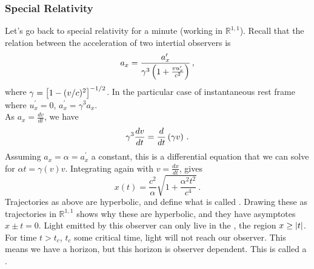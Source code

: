 \documentclass{article}
\begin{document}
\subsubsection{Special Relativity}
Let's go back to special relativity for a minute (working in $\mathbb{R}^{1,1}$). Recall that the relation between the acceleration of two intertial observers is 
\[
a_x = \frac{a_x^\prime}{\gamma^3 \left( 1 + \frac{v u_x^\prime}{c^2} \right)} \, , 
\]
where $\gamma = \left[ 1-(v/c)^2 \right]^{-1/2}$. In the particular case of instantaneous rest frame where $u_x^\prime=0$, $a_x^\prime = \gamma^3 a_x$. \\
	As $a_x = \frac{dv}{dt}$, we have 
	\[
	\gamma^3 \frac{dv}{dt} = \frac{d}{dt} \left( \gamma v \right) \, .
	\]
	Assuming $a_x =\alpha = a_x^\prime$ a constant, this is a differential equation that we can solve for $\alpha t = \gamma(v) v$. Integrating again with $v = \frac{dx}{dt}$, gives 
	\[
	x(t) = \frac{c^2}{\alpha} \sqrt{1+\frac{\alpha^2 t^2}{c^4}} \, .
	\]
	Trajectories as above are hyperbolic, and define what is called . Drawing these as trajectories in $\mathbb{R}^{1,1}$ shows why these are hyperbolic, and they have asymptotes $x \pm t=0$. Light emitted by this observer can only live in the , the region $x\geq \left\lvert t \right\rvert$. For time $t>t_c$, $t_c$ some critical time, light will not reach our observer. This means we have a horizon, but this horizon is observer dependent. This is called a . 

\end{document}
